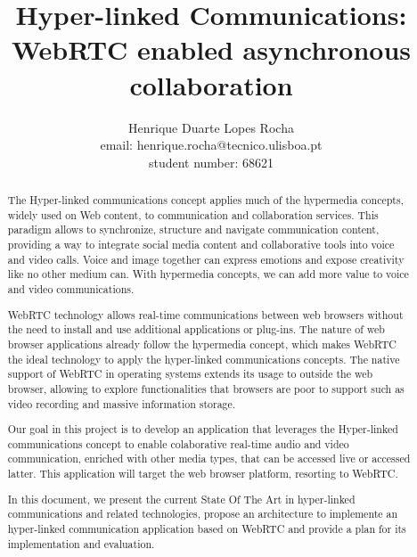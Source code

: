 \documentclass{llncs}
\begin{document}
\pagestyle{plain}
\mainmatter              %

\title{Hyper-linked Communications: WebRTC enabled asynchronous collaboration}
\author{%
	Henrique Duarte Lopes Rocha \\
	email: henrique.rocha@tecnico.ulisboa.pt \\
  student number: 68621
}
\maketitle              %

\begin{abstract}
The Hyper-linked communications concept applies much of the hypermedia concepts, widely used on Web content, to communication and collaboration services. This paradigm allows to synchronize, structure and navigate communication content, providing a way to integrate social media content and collaborative tools into voice and video calls.
Voice and image together can express emotions and expose creativity like no other medium can. With hypermedia concepts, we can add more value to voice and video communications.


WebRTC technology allows real-time communications between web browsers without the need to install and use additional applications or plug-ins. The nature of web browser applications already follow the hypermedia concept, which makes WebRTC the ideal technology to apply the hyper-linked communications concepts.
The native support of WebRTC in operating systems extends its usage to outside the web browser, allowing to explore functionalities that browsers are poor to support such as video recording and massive information storage.

Our goal in this project is to develop an application that leverages the Hyper-linked communications concept to enable colaborative real-time audio and video communication, enriched with other media types, that can be accessed live or accessed latter.
This application will target the web browser platform, resorting to WebRTC.

In this document, we present the current State Of The Art in hyper-linked communications and related technologies, propose an architecture to implemente an hyper-linked communication application based on WebRTC and provide a plan for its implementation and evaluation.


\end{abstract}
\end{document}

